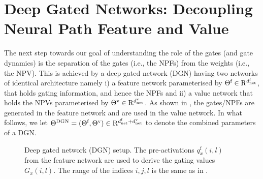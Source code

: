 \documentclass{article}
\begin{document}
\section{Deep Gated Networks: Decoupling Neural Path Feature and Value}\label{sec:decoupled}
The next step towards our goal of understanding the role of the gates (and gate dynamics) is the separation of the gates (i.e., the NPFs) from the weights  (i.e., the NPV).  This is achieved by a deep gated network (DGN) having two networks of identical architecture namely i) a feature network parameterised by $\Theta^{\textrm{f}}\in\mathrm{R}^{d^{\text{f}}_{\text{net}}}$, that holds gating information, and hence the NPFs and ii) a value network that holds the NPVs parameterised by ${\Theta}^{\text{v}}\in\mathrm{R}^{d^{\text{v}}_{\text{net}}}$. As shown in , the gates/NPFs are generated in the feature network and are used in the value network. In what follows, we let $\Theta^{\text{DGN}}=(\Theta^{\textrm{f}},{\Theta}^{\text{v}})\in\mathrm{R}^{d^{\text{f}}_{\text{net}}+d^{\text{v}}_{\text{net}}}$ to denote the combined parameters of a DGN. 
\begin{figure}[t] 
\begin{minipage}{0.79\columnwidth}
\end{minipage}
\begin{minipage}{0.20\columnwidth}
\end{minipage}
\caption{Deep gated network (DGN) setup.  The pre-activations $q^{\text{f}}_{x}(i,l)$ from the feature network are used to derive the gating values $G_{x}(i,l)$. The range of the indices $i,j,l$ is the same as in . }
\label{fig:dgn}
\end{figure}
\end{document}
